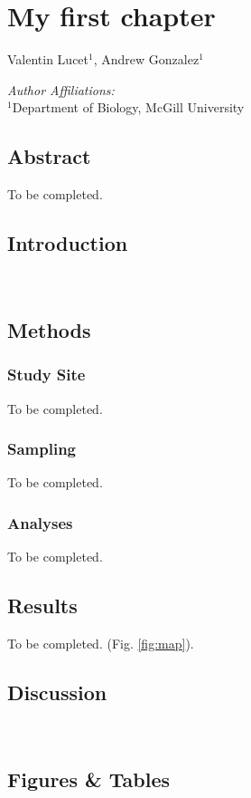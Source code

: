 \chapter{My first chapter}
\begin{center}
{Valentin Lucet$^{1}$, Andrew Gonzalez$^{1}$}\\
\end{center}
\textit{Author Affiliations:}\\
\normalsize{$^{1}$Department of Biology, McGill University}\\
\section{Abstract}
To be completed.
\\
\section{Introduction}
\lipsum[66]\\
\section{Methods}

\subsection*{Study Site}
To be completed.
\\
\subsection*{Sampling}
To be completed.
\\
\subsection*{Analyses}
To be completed.
\\
\section{Results}
To be completed.
(Fig. \ref{fig:map}).
\\
\section{Discussion}
\lipsum[66]
\\

\newpage
\section*{Figures \& Tables}

